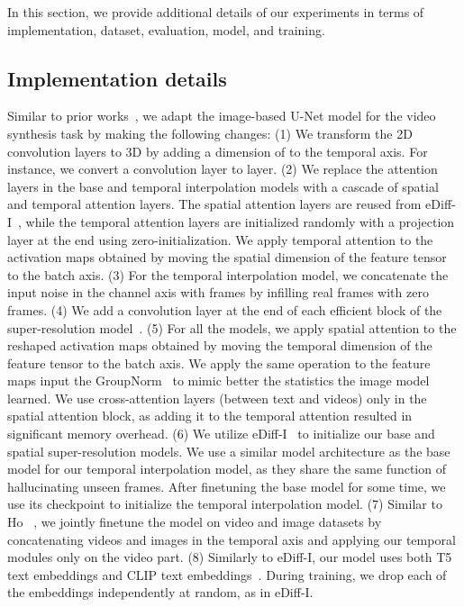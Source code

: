 \documentclass[10pt,twocolumn,letterpaper]{article}
\newcommand{\ediffi}{eDiff-I\xspace}
\begin{document}
In this section, we provide additional details of our experiments in terms of implementation, dataset, evaluation, model, and training.

\subsection{Implementation details}

Similar to prior works~\cite{ho2022video, singer2022make}, we adapt the image-based U-Net model for the video synthesis task by making the following changes: (1) We transform the 2D convolution layers to 3D by adding a dimension of  to the temporal axis. For instance, we convert a  convolution layer to  layer. (2) We replace the attention layers in the base and temporal interpolation models with a cascade of spatial and temporal attention layers. The spatial attention layers are reused from \ediffi~\cite{balaji2022ediffi}, while the temporal attention layers are initialized randomly with a projection layer at the end using zero-initialization. We apply temporal attention to the activation maps obtained by moving the spatial dimension of the feature tensor to the batch axis. (3) For the temporal interpolation model, we concatenate the input noise in the channel axis with  frames by infilling  real frames with zero frames. (4) We add a  convolution layer at the end of each efficient block of the super-resolution model~\cite{saharia2022photorealistic}. (5) For all the models, we apply spatial attention to the reshaped activation maps obtained by moving the temporal dimension of the feature tensor to the batch axis. We apply the same operation to the feature maps input the GroupNorm~\cite{wu2018group} to mimic better the statistics the image model learned. We use cross-attention layers (between text and videos) only in the spatial attention block, as adding it to the temporal attention resulted in significant memory overhead. (6)  We utilize \ediffi~\cite{balaji2022ediffi} to initialize our base and spatial super-resolution models. We use a similar model architecture as the base model for our temporal interpolation model, as they share the same function of hallucinating unseen frames. After finetuning the base model for some time, we use its checkpoint to initialize the temporal interpolation model. (7) Similar to Ho \etal~\cite{ho2022video}, we jointly finetune the model on video and image datasets by concatenating videos and images in the temporal axis and applying our temporal modules only on the video part. (8) Similarly to \ediffi, our model uses both T5~\cite{raffel2020exploring} text embeddings and CLIP text embeddings~\cite{radford2021learning}. During training, we drop each of the embeddings independently at random, as in \ediffi.
\end{document}
